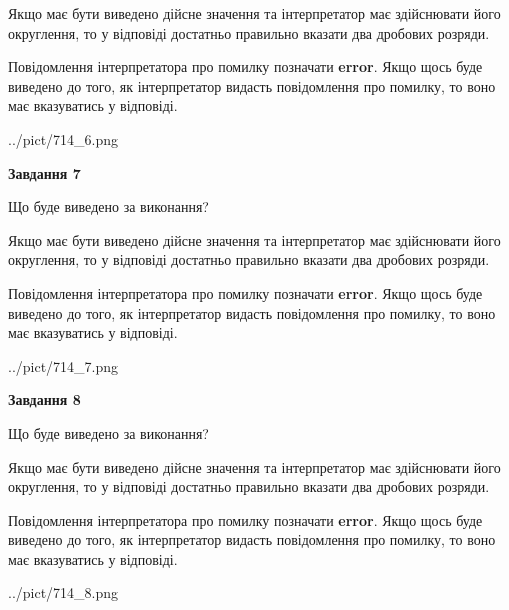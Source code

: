 \documentclass[12pt, ukrainian]{article}
\begin{document}
{\begin {Large}
Якщо має бути виведено дійсне значення та інтерпретатор має здійснювати його округлення, 
то у відповіді достатньо правильно вказати два дробових розряди.

Повідомлення інтерпретатора про помилку позначати \textbf{error}.
Якщо щось буде виведено до того, як інтерпретатор видасть повідомлення про помилку, 
то воно має вказуватись у відповіді. \par

\begin{center}
	{../pict/714_6.png}
\end{center}
\newpage

{\begin {center}\textbf{Завдання 7}\end {center}}\par
Що буде виведено за виконання? \par

Якщо має бути виведено дійсне значення та інтерпретатор має здійснювати його округлення, 
то у відповіді достатньо правильно вказати два дробових розряди.

Повідомлення інтерпретатора про помилку позначати \textbf{error}.
Якщо щось буде виведено до того, як інтерпретатор видасть повідомлення про помилку, 
то воно має вказуватись у відповіді. \par

\begin{center}
	{../pict/714_7.png}
\end{center}
\newpage

{\begin {center}\textbf{Завдання 8}\end {center}}\par
Що буде виведено за виконання? \par

Якщо має бути виведено дійсне значення та інтерпретатор має здійснювати його округлення, 
то у відповіді достатньо правильно вказати два дробових розряди.

Повідомлення інтерпретатора про помилку позначати \textbf{error}.
Якщо щось буде виведено до того, як інтерпретатор видасть повідомлення про помилку, 
то воно має вказуватись у відповіді. \par

\begin{center}
	{../pict/714_8.png}
\end{center}
\newpage


\end{Large}}
\end{document}
